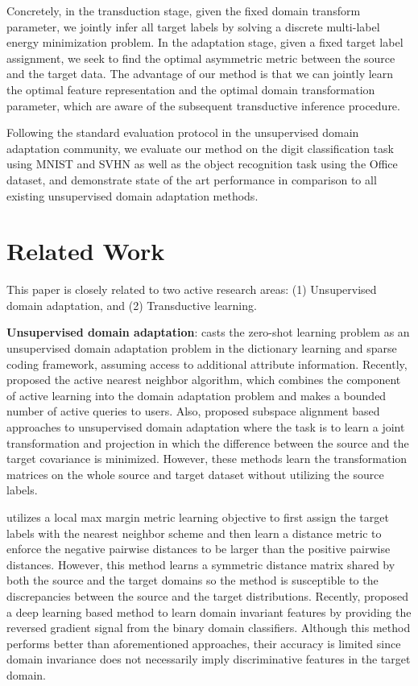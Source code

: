 \documentclass{article}
\begin{document}
Concretely, in the transduction stage, given the fixed domain transform parameter, we jointly infer all target labels by solving a discrete multi-label energy minimization problem. In the adaptation stage, given a fixed target label assignment, we seek to find the optimal asymmetric metric  between the source and the target data. The advantage of our method is that we can jointly learn the optimal feature representation and the optimal domain transformation parameter, which are aware of the subsequent transductive inference procedure. 

Following the standard evaluation protocol in the unsupervised domain adaptation community, we evaluate our method on the digit classification task using MNIST \cite{mnist} and SVHN\cite{svhn} as well as the object recognition task using the Office \cite{office} dataset, and demonstrate state of the art performance in comparison to all existing unsupervised domain adaptation methods.  %

\section{Related Work} 

This paper is closely related to two active research areas: (1) Unsupervised domain adaptation, and (2) Transductive learning.

\textbf{Unsupervised domain adaptation}: \cite{iccv15} casts the zero-shot learning \cite{zsl} problem as an unsupervised domain adaptation problem in the dictionary learning and sparse coding framework, assuming access to additional attribute information. Recently, \cite{activeNN} proposed the active nearest neighbor algorithm, which combines the component of active learning into the domain adaptation problem and makes a bounded number of active queries to users. Also, \cite{gong12, fernando13, baochen16} proposed subspace alignment based approaches to unsupervised domain adaptation where the task is to learn a joint transformation and projection in which the difference between the source and the target covariance is minimized. However, these methods learn the transformation matrices on the whole source and target dataset without utilizing the source labels. 

\cite{tommasi13} utilizes a local max margin metric learning objective \cite{lmnn} to first assign the target labels with the nearest neighbor scheme and then learn a distance metric to enforce the negative pairwise distances to be larger than the positive pairwise distances. However, this method learns a symmetric distance matrix shared by both the source and the target domains so the method is susceptible to the discrepancies between the source and the target distributions. Recently, \cite{ganin15, tzeng14} proposed a deep learning based method to learn domain invariant features by providing the reversed gradient signal from the binary domain classifiers. Although this method performs better than aforementioned approaches, their accuracy is limited since domain invariance does not necessarily imply discriminative features in the target domain. 
\end{document}
